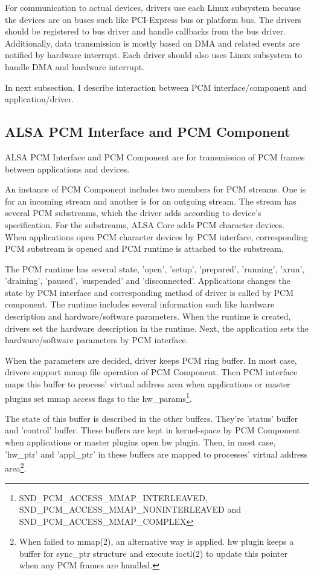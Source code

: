 \documentclass[onecolumn]{article}
\begin{document}
For communication to actual devices, drivers use each Linux subsystem because the devices are on buses such like PCI-Express bus or platform bus. The drivers should be registered to bus driver and handle callbacks from the bus driver. Additionally, data transmission is mostly based on DMA and related events are notified by hardware interrupt. Each driver should also uses Linux subsystem to handle DMA and hardware interrupt.

In next subsection, I describe interaction between PCM interface/component and application/driver.

\subsection{ALSA PCM Interface and PCM Component}
\label{sec:alsa-pcm}

ALSA PCM Interface and PCM Component are for transmission of PCM frames between applications and devices.

An instance of PCM Component includes two members for PCM streams. One is for an incoming stream and another is for an outgoing stream. The stream has several PCM substreams, which the driver adds according to device's specification. For the substreams, ALSA Core adds PCM character devices. When applications open PCM character devices by PCM interface, corresponding PCM substream is opened and PCM runtime is attached to the substream.

The PCM runtime has several state, 'open', 'setup', 'prepared', 'running', 'xrun', 'draining', 'paused', 'suspended' and 'disconnected'\cite{alsa-lib}. Applications changes the state by PCM interface and corresponding method of driver is called by PCM component. The runtime includes several information such like hardware description and hardware/software parameters. When the runtime is created, drivers set the hardware description in the runtime. Next, the application sets the hardware/software parameters by PCM interface.

When the parameters are decided, driver keeps PCM ring buffer. In most case, drivers support mmap file operation of PCM Component. Then PCM interface maps this buffer to process' virtual address area when applications or master plugins set mmap access flags to the hw\_params\footnote{SND\_PCM\_ACCESS\_MMAP\_INTERLEAVED, SND\_PCM\_ACCESS\_MMAP\_NONINTERLEAVED and SND\_PCM\_ACCESS\_MMAP\_COMPLEX}.

The state of this buffer is described in the other buffers. They're 'status' buffer and 'control' buffer. These buffers are kept in kernel-space by PCM Component when applications or master plugins open hw plugin. Then, in most case, 'hw\_ptr' and 'appl\_ptr' in these buffers are mapped to processes' virtual address area\footnote{When failed to mmap(2), an alternative way is applied. hw plugin keeps a buffer for sync\_ptr structure and execute ioctl(2) to update this pointer when any PCM frames are handled.}.
\end{document}
